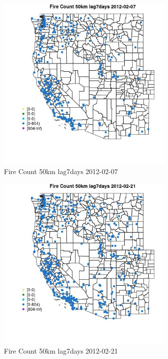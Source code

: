 \begin{figure} 
\centering  
\includegraphics[width=0.77\textwidth]{Code_Outputs/Report_ML_input_PM25_Step4_part_f_de_duplicated_aveswNAs_MapObsFire_Count_50km_lag7days2012-02-07.jpg} 
\caption{\label{fig:Report_ML_input_PM25_Step4_part_f_de_duplicated_aveswNAsMapObsFire_Count_50km_lag7days2012-02-07}Fire Count 50km lag7days 2012-02-07} 
\end{figure} 
 

\begin{figure} 
\centering  
\includegraphics[width=0.77\textwidth]{Code_Outputs/Report_ML_input_PM25_Step4_part_f_de_duplicated_aveswNAs_MapObsFire_Count_50km_lag7days2012-02-21.jpg} 
\caption{\label{fig:Report_ML_input_PM25_Step4_part_f_de_duplicated_aveswNAsMapObsFire_Count_50km_lag7days2012-02-21}Fire Count 50km lag7days 2012-02-21} 
\end{figure} 
 

